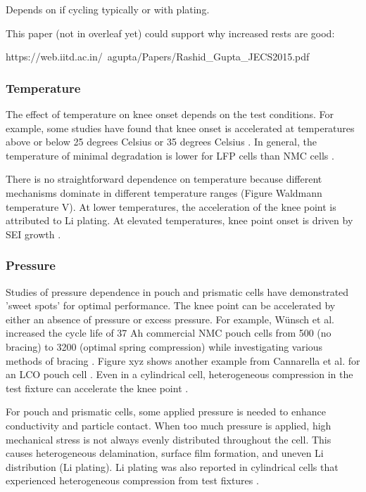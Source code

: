 \documentclass{article}
\begin{document}
Depends on if cycling typically or with plating.

This paper (not in overleaf yet) could support why increased rests are good:

https://web.iitd.ac.in/~agupta/Papers/Rashid_Gupta_JECS2015.pdf 

\subsubsection{Temperature}
The effect of temperature on knee onset depends on the test conditions. For example, some studies have found that knee onset is accelerated at temperatures above or below 25 degrees Celsius \cite{zhang_accelerated_2019, waldmann_temperature_2014, waldmann_optimization_2015} or 35 degrees Celsius \cite{schuster_nonlinear_2015}. In general, the temperature of minimal degradation is lower for LFP cells than NMC cells \cite{SNL long-term cycling paper}. 

There is no straightforward dependence on temperature because different mechanisms dominate in different temperature ranges (Figure Waldmann temperature V). At lower temperatures, the acceleration of the knee point is attributed to Li plating. At elevated temperatures, knee point onset is driven by SEI growth \cite {zhang_accelerated_2019,schuster_nonlinear_2015,waldmann_temperature_2014,waldmann_optimization_2015}.

\subsubsection{Pressure}
Studies of pressure dependence in pouch and prismatic cells have demonstrated 'sweet spots' for optimal performance. The knee point can be accelerated by either an absence of pressure or excess pressure. For example, Wünsch et al. increased the cycle life of 37 Ah commercial NMC pouch cells from 500 (no bracing) to 3200 (optimal spring compression) while investigating various methods of bracing \cite{wunsch_investigation_2019}. Figure xyz shows another example from Cannarella et al. for an LCO pouch cell \cite{cannarella_stress_2014}. Even in a cylindrical cell, heterogeneous compression in the test fixture can accelerate the knee point \cite{bach_nonlinear_2016}. 

For pouch and prismatic cells, some applied pressure is needed to enhance conductivity and particle contact. When too much pressure is applied, high mechanical stress is not always evenly distributed throughout the cell. This causes heterogeneous delamination, surface film formation, and uneven Li distribution (Li plating). Li plating was also reported in cylindrical cells that experienced heterogeneous compression from test fixtures \cite{bach_nonlinear_2016}. 
\end{document}
